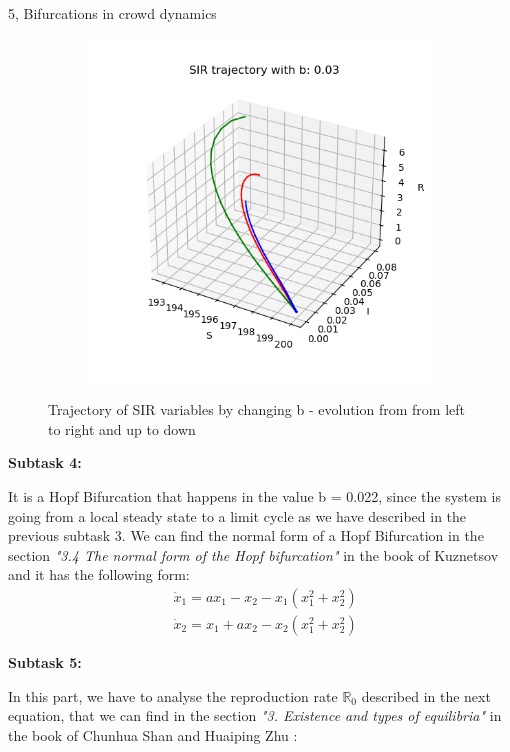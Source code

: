 \documentclass[10pt,a4paper]{article}
\begin{document}
\begin{task}{5, Bifurcations in crowd dynamics }
\begin{figure} [H]
\begin{subfigure} {0.33\textwidth}
\end{subfigure}
\begin{subfigure} {0.33\textwidth}
    \centering
    \label{task5-3-9}
    \includegraphics[width=.9\linewidth]{images/0.03.png} 
\end{subfigure}
    \caption{Trajectory of SIR variables by changing b - evolution from from left to right and up to down}
    \label{plots}
\end{figure}

\noindent \textbf{Subtask 4:} 

It is a Hopf Bifurcation that happens in the value b = 0.022, since the system is going from a local steady state to a limit cycle as we have described in the previous subtask 3. We can find the normal form of a Hopf Bifurcation in the section \textit{"3.4 The normal form of the Hopf bifurcation"} in the book of Kuznetsov \cite{Yuri} and it has the following form:
\begin{equation}\label{normalform1}
    \begin{split}
    & \dot{x}_1 = ax_1 - x_2 - x_1(x_1^2 + x_2^2) \\
    & \dot{x}_2 = x_1 + ax_2 - x_2(x_1^2 + x_2^2)
    \end{split}
\end{equation}

\newpage

\noindent \textbf{Subtask 5:} 

In this part, we have to analyse the reproduction rate $\mathbb{R}_0$ described in the next equation, that we can find in the section \textit{"3. Existence and types of equilibria"} in the book of Chunhua Shan and Huaiping Zhu \cite{Chunhua}: 


\end{task}
\end{document}
